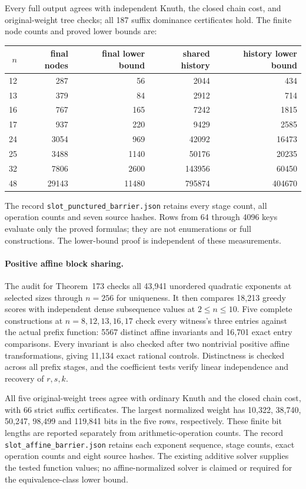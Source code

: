 \documentclass[11pt]{article}
\begin{document}
Every full output agrees with independent Knuth, the closed chain cost,
and original-weight tree checks; all 187 suffix dominance certificates
hold. The finite node counts and proved lower bounds are:
\begin{center}
\begin{tabular}{r|r r|r r}
$n$ & final nodes & final lower bound & shared history & history lower bound\\
\hline
12 & 287 & 56 & 2044 & 434\\
13 & 379 & 84 & 2912 & 714\\
16 & 767 & 165 & 7242 & 1815\\
17 & 937 & 220 & 9429 & 2585\\
24 & 3054 & 969 & 42092 & 16473\\
25 & 3488 & 1140 & 50176 & 20235\\
32 & 7806 & 2600 & 143956 & 60450\\
48 & 29143 & 11480 & 795874 & 404670
\end{tabular}
\end{center}
The record \texttt{slot\_punctured\_barrier.json} retains every stage count,
all operation counts and seven source hashes. Rows from 64 through 4096
keys evaluate only the proved formulas; they are not enumerations or full
constructions. The lower-bound proof is independent of these measurements.

\paragraph{Positive affine block sharing.}
The audit for Theorem~173 checks all 43,941
unordered quadratic exponents at selected sizes through $n=256$ for
uniqueness. It then compares 18,213 greedy scores with independent dense
subsequence values at $2\le n\le10$. Five complete constructions at
$n=8,12,13,16,17$ check every witness's three entries against the actual
prefix function: 5567 distinct affine invariants and 16,701 exact entry
comparisons. Every invariant is also checked after two nontrivial positive
affine transformations, giving 11,134 exact rational controls. Distinctness
is checked across all prefix stages, and the coefficient tests verify
linear independence and recovery of $r,s,k$.

All five original-weight trees agree with ordinary Knuth and the closed
chain cost, with 66 strict suffix certificates. The largest normalized
weight has 10,322, 38,740, 50,247, 98,499 and 119,841 bits in the five
rows, respectively. These finite bit lengths are reported separately from
arithmetic-operation counts. The record \texttt{slot\_affine\_barrier.json}
retains each exponent sequence, stage counts, exact operation counts and
eight source hashes. The existing additive solver supplies the tested
function values; no affine-normalized solver is claimed or required for
the equivalence-class lower bound.
\end{document}
